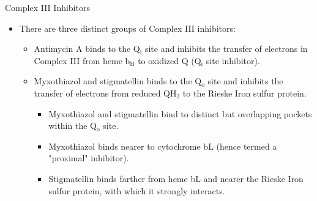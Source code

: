 \documentclass[presentation, smaller]{beamer}
\begin{document}
\begin{frame}[label={sec:org8eb3685}]{Complex III Inhibitors}
\begin{itemize}
\item There are three distinct groups of Complex III inhibitors:
\begin{itemize}
\item Antimycin A binds to the Q\(_{\text{i}}\) site and inhibits the transfer of electrons in Complex III from heme b\(_{\text{H}}\) to oxidized Q (Q\(_{\text{i}}\) site inhibitor).
\item Myxothiazol and stigmatellin binds to the Q\(_{\text{o}}\) site and inhibits the transfer of electrons from reduced QH\(_{\text{2}}\) to the Rieske Iron sulfur protein.
\begin{itemize}
\item Myxothiazol and stigmatellin bind to distinct but overlapping pockets within the Q\(_{\text{o}}\) site.
\item Myxothiazol binds nearer to cytochrome bL (hence termed a "proximal" inhibitor).
\item Stigmatellin binds farther from heme bL and nearer the Rieske Iron sulfur protein, with which it strongly interacts.
\end{itemize}
\end{itemize}
\end{itemize}
\end{frame}
\end{document}
